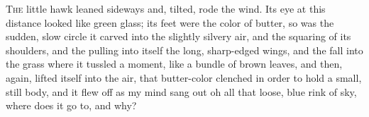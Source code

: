 
\begin{poem}
\begin{stanza}
\textsc{The} little hawk leaned sideways and, tilted,\verseline
rode the wind. Its eye at this distance looked\verseline
like green glass; its feet were the color\verseline
of butter, so was the sudden, slow circle it carved\verseline
into the slightly silvery air, and the\verseline
squaring of its shoulders, and the pulling into\verseline
itself the long, sharp-edged wings, and the\verseline
fall into the grass where it tussled a moment,\verseline
like a bundle of brown leaves, and then, again,\verseline
lifted itself into the air, that butter-color\verseline
clenched in order to hold a small, still\verseline
body, and it flew off as my mind sang out oh\verseline
all that loose, blue rink of sky, where does\verseline
it go to, and why?
\end{stanza}
\end{poem}